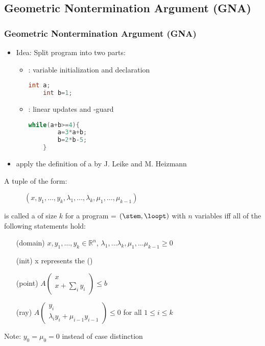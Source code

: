 \subsection{Geometric Nontermination Argument (GNA)}
\begin{frame}[fragile]
	\frametitle{Geometric Nontermination Argument (GNA)}
	\begin{itemize}
		\item Idea: Split program into two parts:
			\begin{itemize}
				\item \stem: variable initialization and declaration
					\begin{lstlisting}[language = java]
	int a;
	int b=1;
					\end{lstlisting}
				\item \loopt: linear updates and -guard
				\begin{lstlisting}[language = java]
	while(a+b>=4){
		a=3*a+b;
		b=2*b-5;
	}
				\end{lstlisting}
			\end{itemize}
		\item apply the definition of a \gna by J. Leike and M. Heizmann 
	\end{itemize}
\end{frame}

\begin{frame}
	\begin{definition}
		\label{def:gna}
		A tuple of the form:
		\vspace{-1em}
		\begin{figure}
			\centering
			$(x, y_1, \dots, y_k, \lambda_1, \dots, \lambda_k, \mu_1, \dots, \mu_{k-1})$
		\end{figure}  
		\vspace{-1em}
		is called a \gna of size $k$ for a program = $(\stem, \loopt)$ with $n$ variables iff all of the following statements hold:
		\begin{itemize}
			\setlength{\itemindent}{1in}
			\item[(domain)] $x, y_1, \dots, y_k \in \mathbb{R}^n$, $\lambda_1, \dots \lambda_k, \mu_1, \dots \mu_{k-1} \ge 0$
			\item[(init)] x represents the \startterm (\stem)
			\item[(point)] $A\begin{pmatrix} x \\ x + \sum_i y_i \end{pmatrix} \le b$
			\item[(ray)] $A\begin{pmatrix} y_i \\ \lambda_i y_i + \mu_{i-1} y_{i-1} \end{pmatrix} \le 0$ for all $1 \le i \le k$
		\end{itemize}
		Note: $y_0 = \mu_0 = 0$ instead of case distinction
	\end{definition}
\end{frame}

